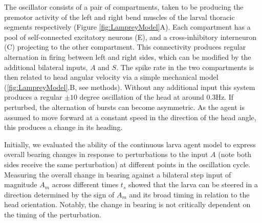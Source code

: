 \documentclass[11pt,a4paper]{article}
\newcommand{\todoBW}[1]{\todo[author=BW,color=orange, size=\tiny,inline]{#1}}
\begin{document}
The oscillator consists of a pair of compartments, taken to be producing the premotor activity of the left and right bend muscles of the larval thoracic  segments respectively (Figure \ref{fig:LampreyModel}A). Each compartment has a pool of self-connected excitatory neurons (E), and a cross-inhibitory interneuron (C) projecting to the other compartment. This connectivity produces regular alternation in firing between left and right sides, which can be modified by the additional bilateral inputs, $A$ and $S$. The spike rate in the two compartments is then related to head angular velocity via a simple mechanical model (\ref{fig:LampreyModel}.B, see methods). Without any additional input this system produces a regular $\pm 10$ degree oscillation of the head at around 0.3Hz. If perturbed, the alternation of bursts can become asymmetric. As the agent is assumed to move forward at a constant speed in the direction of the head angle, this produces a change in its heading.

Initially, we evaluated the ability of the continuous larva agent model to express overall bearing changes in response to perturbations to the input $A$ (note both sides receive the same perturbation) at different points in the oscillation cycle. Measuring the overall change in bearing against a bilateral step input of magnitude $A_m$ across different times $t_s$ showed that the larva can be steered in a direction determined by the sign of $A_m$ and its broad timing in relation to the head orientation.
Notably, the change in bearing is not critically dependent on the timing of the perturbation. 

\end{document}
